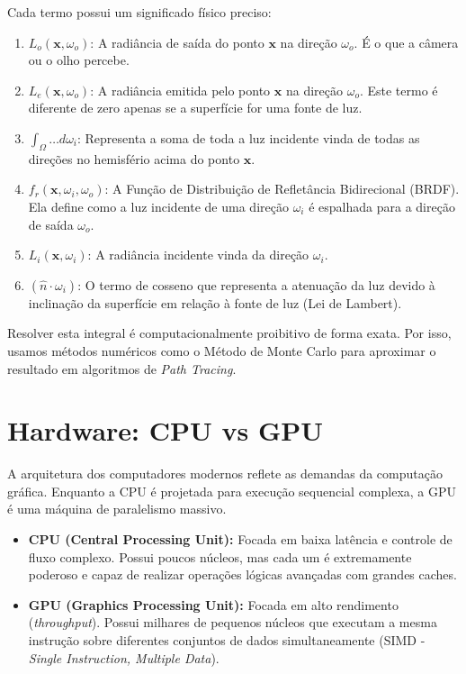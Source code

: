 Cada termo possui um significado físico preciso:
\begin{enumerate}
    \item $L_o(\mathbf{x}, \omega_o)$: A radiância de saída do ponto $\mathbf{x}$ na direção $\omega_o$. É o que a câmera ou o olho percebe.
    \item $L_e(\mathbf{x}, \omega_o)$: A radiância emitida pelo ponto $\mathbf{x}$ na direção $\omega_o$. Este termo é diferente de zero apenas se a superfície for uma fonte de luz.
    \item $\int_\Omega \dots d\omega_i$: Representa a soma de toda a luz incidente vinda de todas as direções no hemisfério acima do ponto $\mathbf{x}$.
    \item $f_r(\mathbf{x}, \omega_i, \omega_o)$: A Função de Distribuição de Refletância Bidirecional (BRDF). Ela define como a luz incidente de uma direção $\omega_i$ é espalhada para a direção de saída $\omega_o$.
    \item $L_i(\mathbf{x}, \omega_i)$: A radiância incidente vinda da direção $\omega_i$.
    \item $(\hat{n}\cdot\omega_i)$: O termo de cosseno que representa a atenuação da luz devido à inclinação da superfície em relação à fonte de luz (Lei de Lambert).
\end{enumerate}

\begin{aviso}
    Resolver esta integral é computacionalmente proibitivo de forma exata. Por isso, usamos métodos numéricos como o Método de Monte Carlo para aproximar o resultado em algoritmos de \textit{Path Tracing}.
\end{aviso}

\section{Hardware: CPU vs GPU}

A arquitetura dos computadores modernos reflete as demandas da computação gráfica. Enquanto a CPU é projetada para execução sequencial complexa, a GPU é uma máquina de paralelismo massivo.

\begin{itemize}
    \item \textbf{CPU (Central Processing Unit):} Focada em baixa latência e controle de fluxo complexo. Possui poucos núcleos, mas cada um é extremamente poderoso e capaz de realizar operações lógicas avançadas com grandes caches.
    \item \textbf{GPU (Graphics Processing Unit):} Focada em alto rendimento (\textit{throughput}). Possui milhares de pequenos núcleos que executam a mesma instrução sobre diferentes conjuntos de dados simultaneamente (SIMD - \textit{Single Instruction, Multiple Data}).
\end{itemize}

